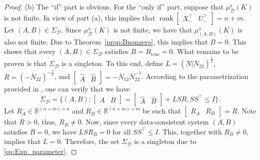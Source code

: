\documentclass[9pt,shortpaper,twoside,web]{ieeecolor}
\DeclareMathOperator{\rank}{rank}
\begin{document}
\begin{proof}
(b) The ``if'' part is obvious. For the ``only if'' part, suppose that $\mu_{\mathcal{D}}^{\text{a}}(K)$ is not finite. In view of part (a), this implies that $\rank \begin{bmatrix}X_-^\top & U_-^\top\end{bmatrix}=n+m$. Let $(A,B)\in\Sigma_\mathcal{D}$. Since $\mu_{\mathcal{D}}^{\text{a}}(K)$ is not finite, we have that $\mu_{(A,B)}^{\text{a}}(K)$ is also not finite. Due to Theorem~\ref{prop:Bnonzero}, this implies that $B=0$. This shows that every $(A,B)\in\Sigma_\mathcal{D}$ satisfies $B=B_\text{true}=0$. What remains to be proven is that $\Sigma_\mathcal{D}$ is a singleton. To this end, define $L=(N|\bar{N}_{22})^{\frac{1}{2}}$, $R=(-\bar{N}_{22})^{-\frac{1}{2}}$, and $\begin{bmatrix}
\hat{A} & \hat{B}
\end{bmatrix}=-\bar{N}_{12}\bar{N}_{22}^{-1}$.
According to the parametrization provided in \cite[Thm. 3.3]{HenkQMI2023}, one can verify that we have 
\begin{equation}
\label{eq:Exp_parameter}
\Sigma_\mathcal{D}=\{(A,B):\begin{bmatrix}
A & B
\end{bmatrix}=\begin{bmatrix}
\hat{A} & \hat{B}
\end{bmatrix}+LSR,SS^\top \leq I\}.
\end{equation}
Let $R_A\in\mathbb{R}^{(n+m)\times n}$ and $R_B\in\mathbb{R}^{(n+m)\times m}$ be such that $\begin{bmatrix}
R_A & R_B
\end{bmatrix}=R$. Note that $R>0$, thus, $R_B\neq0$. Now, since every data-consistent system $(A,B)$ satisfies $B=0$, we have $LSR_B=0$ for all $SS^\top \leq I$. This, together with $R_B\neq0$, implies that $L=0$. Therefore, the set $\Sigma_\mathcal{D}$ is a singleton due to \eqref{eq:Exp_parameter}. 
\end{proof}
\end{document}
